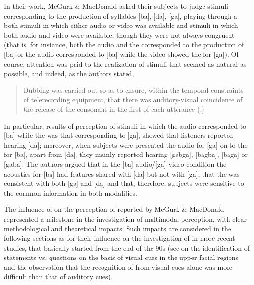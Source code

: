 \documentclass[output=paper]{langsci/langscibook}
\begin{document}
In their \citeyear{McGurk1976} work, McGurk \& MacDonald asked their subjects to judge stimuli corresponding to the production of syllables [ba], [da], [ga], playing through a  both stimuli in which either audio or video was available and stimuli in which both audio and video were available, though they were not always congruent (that is, for instance, both the audio and the  corresponded to the production of [ba] or the audio corresponded to [ba] while the video showed the  for [ga]). Of course, attention was paid to the realization of stimuli that seemed as natural as possible, and indeed, as the authors stated, 

\begin{quote}
Dubbing was carried out so as to ensure, within the temporal constraints of telerecording equipment, that there was auditory-visual coincidence of the release of the consonant in the first  of each utterance (\citealt[746]{McGurk1976}.)
\end{quote}

In particular, results of perception of stimuli in which the audio corresponded to [ba] while the  was that corresponding to [ga], showed that listeners reported hearing [da]; moreover, when subjects were presented the audio for [ga] on to the  for [ba], apart from [da], they mainly reported hearing [gabga], [bagba], [baga] or [gaba]. The authors argued that in the [ba]-audio\slash [ga]-video condition the acoustics for [ba] had features shared with [da] but not with [ga], that the  was consistent with both [ga] and [da] and that, therefore, subjects were sensitive to the common information in both modalities. 

The influence of  on the perception of  reported by McGurk \& MacDonald represented a milestone in the investigation of multimodal perception, with clear methodological and theoretical impacts. Such impacts are considered in the following sections as for their influence on the investigation of  in more recent studies, that basically started from the end of the 90s (see \citealt{Lansing1999} on the identification of statements vs. questions on the basis of visual cues in the upper facial regions and the observation that the recognition of  from visual cues alone was more difficult than that of auditory cues).
\end{document}
